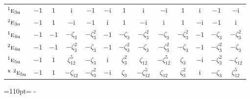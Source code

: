 \documentclass[10pt,a4paper]{article}
\newcommand{\needspace}[1]{\par\penalty-100\begingroup\dimen0=#1\relax\dimen2=\pagegoal
  \advance\dimen2-\pagetotal\ifdim\dimen0>\dimen2\relax\ifdim\dimen2>0pt\vfil\break\fi\fi
  \endgroup}
\numberwithin{equation}{section}
\newcommand{\irr}[1]{\text{\normalfont\scshape #1}}
\newcommand{\conjpair}[1]{{}^{#1}}
\newcommand{\ptag}[1]{\mathrm{#1}}
\newcommand{\iunit}{\mathrm{i}}
\newcommand{\rootunity}[1]{\zeta_{#1}}
\begin{document}
{\begin{longtable}{@{}lcccccccccccc@{}}
$\conjpair{1}\irr{e}_{3\ptag{u}}$ & $-1$ & $1$ & $\iunit{}$ & $-1$ & $-\iunit{}$ & $1$ & $\iunit{}$ & $-\iunit{}$ & $1$ & $\iunit{}$ & $-1$ & $-\iunit{}$\\
$\conjpair{2}\irr{e}_{3\ptag{u}}$ & $-1$ & $1$ & $-\iunit{}$ & $-1$ & $\iunit{}$ & $1$ & $-\iunit{}$ & $\iunit{}$ & $1$ & $-\iunit{}$ & $-1$ & $\iunit{}$\\
$\conjpair{1}\irr{e}_{4\ptag{u}}$ & $-1$ & $-1$ & $-\rootunity{3}$ & $-\rootunity{3}^{2}$ & $-1$ & $-\rootunity{3}$ & $-\rootunity{3}^{2}$ & $-\rootunity{3}$ & $-\rootunity{3}^{2}$ & $-1$ & $-\rootunity{3}$ & $-\rootunity{3}^{2}$\\
$\conjpair{2}\irr{e}_{4\ptag{u}}$ & $-1$ & $-1$ & $-\rootunity{3}^{2}$ & $-\rootunity{3}$ & $-1$ & $-\rootunity{3}^{2}$ & $-\rootunity{3}$ & $-\rootunity{3}^{2}$ & $-\rootunity{3}$ & $-1$ & $-\rootunity{3}^{2}$ & $-\rootunity{3}$\\
$\conjpair{1}\irr{e}_{5\ptag{u}}$ & $-1$ & $1$ & $\rootunity{12}^{5}$ & $-\rootunity{3}$ & $\iunit{}$ & $\rootunity{3}^{2}$ & $\rootunity{12}$ & $-\rootunity{12}^{5}$ & $\rootunity{3}$ & $-\iunit{}$ & $-\rootunity{3}^{2}$ & $-\rootunity{12}$\\*
$\conjpair{2}\irr{e}_{5\ptag{u}}$ & $-1$ & $1$ & $-\rootunity{12}$ & $-\rootunity{3}^{2}$ & $-\iunit{}$ & $\rootunity{3}$ & $-\rootunity{12}^{5}$ & $\rootunity{12}$ & $\rootunity{3}^{2}$ & $\iunit{}$ & $-\rootunity{3}$ & $\rootunity{12}^{5}$\\
\bottomrule\end{longtable}}
\needspace{110pt}
\end{document}
